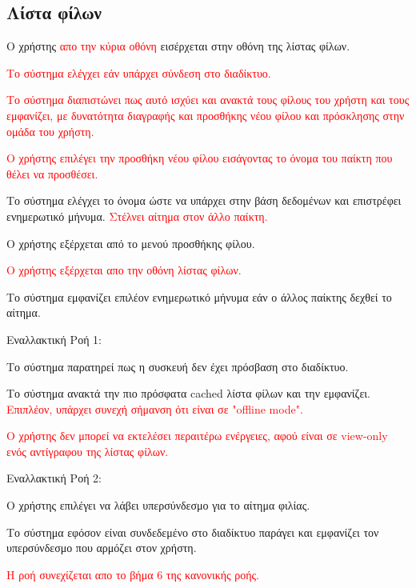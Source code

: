 \subsection{Λίστα φίλων}
\label{sec:friendslist}
\begin{enumerate}
\item Ο χρήστης \textcolor{red}{απο την κύρια οθόνη} εισέρχεται στην οθόνη της λίστας φίλων.
\textcolor{red}{
\item Το σύστημα ελέγχει εάν υπάρχει σύνδεση στο διαδίκτυο.
\item Το σύστημα διαπιστώνει πως αυτό ισχύει και ανακτά τους φίλους του χρήστη και τους εμφανίζει, με δυνατότητα διαγραφής και προσθήκης νέου φίλου και πρόσκλησης στην ομάδα του χρήστη.
\item Ο χρήστης επιλέγει την προσθήκη νέου φίλου εισάγοντας το όνομα του παίκτη που θέλει να προσθέσει.}
\item Το σύστημα ελέγχει το όνομα ώστε να υπάρχει στην βάση δεδομένων και επιστρέφει ενημερωτικό μήνυμα. \textcolor{red}{Στέλνει αίτημα στον άλλο παίκτη.}
\item Ο χρήστης εξέρχεται από το μενού προσθήκης φίλου.
\textcolor{red}{
\item Ο χρήστης εξέρχεται απο την οθόνη λίστας φίλων.
}
\item Το σύστημα εμφανίζει επιλέον ενημερωτικό μήνυμα εάν ο άλλος παίκτης δεχθεί το αίτημα.
\end{enumerate}


Εναλλακτική Ροή 1:
\begin{enumerate}[label=3..\alph*.,ref=3..\alph*]
\item Το σύστημα παρατηρεί πως η συσκευή δεν έχει πρόσβαση στο διαδίκτυο.
\item Το σύστημα ανακτά την πιο πρόσφατα cached λίστα φίλων και την εμφανίζει. \textcolor{red}{Επιπλέον, υπάρχει συνεχή σήμανση ότι είναι σε "offline mode".}
\textcolor{red}{
\item Ο χρήστης δεν μπορεί να εκτελέσει περαιτέρω ενέργειες, αφού είναι σε view-only ενός αντίγραφου της λίστας φίλων.
}
\end{enumerate}

Εναλλακτική Ροή 2:
\begin{enumerate}[label=4.\alph*.,ref=4.\alph*]
\item Ο χρήστης επιλέγει να λάβει υπερσύνδεσμο για το αίτημα φιλίας.
\item Το σύστημα εφόσον είναι συνδεδεμένο στο διαδίκτυο παράγει και εμφανίζει τον υπερσύνδεσμο που αρμόζει στον χρήστη.
\textcolor{red}{
\item Η ροή συνεχίζεται απο το βήμα 6 της κανονικής ροής.
}
\end{enumerate}

